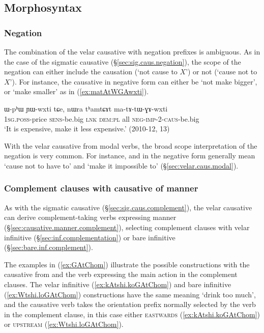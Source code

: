  
\subsection{Morphosyntax} \label{sec:velar.causative.morphosyntax}

\subsubsection{Negation} \label{sec:velar.causative.negation}
The combination of the velar causative with negation prefixes is ambiguous. As in the case of the sigmatic causative (§\ref{sec:sig.caus.negation}), the scope of the negation can either include the causation (`not cause to $X$') or not (`cause not to $X$'). For instance, the causative   in negative form can either be `not make bigger', or  `make smaller' as in (\ref{ex:matAtWGAwxti}).

\begin{exe}
\ex \label{ex:matAtWGAwxti}
\gll  ɯ-pʰɯ ɲɯ-wxti tɕe, nɯra tʰamtɕɤt ma-tɤ-tɯ-ɣɤ-wxti \\
\textsc{1sg}.\textsc{poss}-price \textsc{sens}-be.big \textsc{lnk} \textsc{dem}:\textsc{pl} all \textsc{neg}-\textsc{imp}-2-\textsc{caus}-be.big \\
\glt  `It is expensive, make it less expensive.' (2010-12, 13)
\end{exe} 
 
With the velar causative from modal verbs, the broad scope interpretation of the negation is very common. For instance,   and   in the negative form generally mean `cause not to have to' and `make it impossible to' (§\ref{sec:velar.caus.modal}).
 
\subsubsection{Complement clauses with causative of manner} \label{sec:velar.caus.complement}
As with the sigmatic causative (§\ref{sec:sig.caus.complement}), the velar causative can derive com\-ple\-ment-taking verbs expressing manner (§\ref{sec:causative.manner.complement}), selecting complement clauses with velar infinitive (§\ref{sec:inf.complementation}) or bare infinitive (§\ref{sec:bare.inf.complement}).

The examples in (\ref{ex:GAtChom}) illustrate the possible constructions with the causative  from and the verb  expressing the main action in the complement clauses. The velar infinitive (\ref{ex:kAtshi.koGAtChom}) and bare infinitive (\ref{ex:Wtshi.loGAtChom}) constructions have the same meaning `drink too much', and the causative verb takes the orientation prefix normally selected by the verb in the complement clause, in this case either \textsc{eastwards} (\ref{ex:kAtshi.koGAtChom}) or \textsc{upstream} (\ref{ex:Wtshi.loGAtChom}). 

